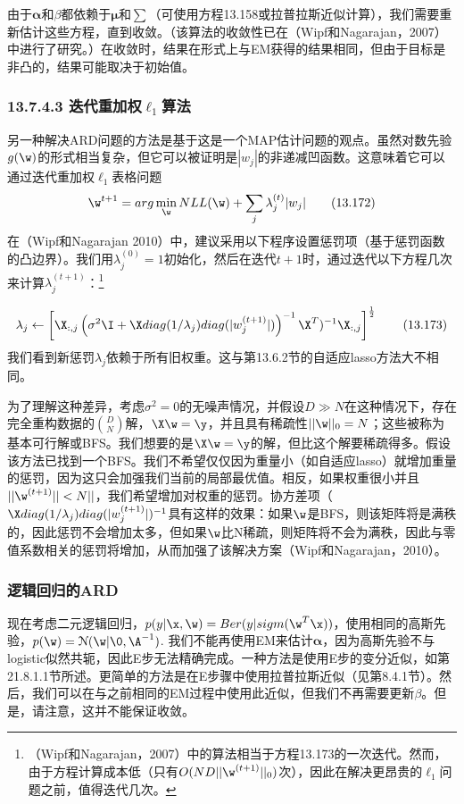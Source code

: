 \documentclass[a4paper]{article}
\begin{document}
由于$\boldsymbol{\alpha}$和$\beta$都依赖于$\boldsymbol{\mu}$和$\boldsymbol{\textstyle\sum}$（可使用方程13.158或拉普拉斯近似计算），我们需要重新估计这些方程，直到收敛。（该算法的收敛性已在（Wipf和Nagarajan，2007）中进行了研究。）在收敛时，结果在形式上与EM获得的结果相同，但由于目标是非凸的，结果可能取决于初始值。

\subsubsection*{13.7.4.3  迭代重加权$\ell_1$算法}
另一种解决ARD问题的方法是基于这是一个MAP估计问题的观点。虽然对数先验$g(\w)$的形式相当复杂，但它可以被证明是$|w_j|$的非递减凹函数。这意味着它可以通过迭代重加权$\ell_1$表格问题
\begin{equation}
	\w^{t+1}=arg \min_\w NLL(\w)+\sum_{j}\lambda_j^{(t)}|w_j|\tag{13.172}
\end{equation}
在（Wipf和Nagarajan 2010）中，建议采用以下程序设置惩罚项（基于惩罚函数的凸边界）。我们用$\lambda_j^{(0)}=1$初始化，然后在迭代$t+1$时，通过迭代以下方程几次来计算$\lambda_j^{(t+1)}$：\footnote{（Wipf和Nagarajan，2007）中的算法相当于方程13.173的一次迭代。然而，由于方程计算成本低（只有$O(ND||\w^{(t+1)}||_0)$次），因此在解决更昂贵的$\ell_1$问题之前，值得迭代几次。}

\begin{equation}
	\lambda_j\gets \left[\X_{:,j}\left(\sigma^2\I+\X diag(1/\lambda_j)diag(|w_j^{(t+1)}|)\right)^{-1}\X^T)^{-1}\X_{:,j}\right]^{\frac{1}{2}}\tag{13.173}
\end{equation}
我们看到新惩罚$\lambda_j$依赖于所有旧权重。这与第13.6.2节的自适应lasso方法大不相同。

为了理解这种差异，考虑$\sigma^2=0$的无噪声情况，并假设$D\gg N$在这种情况下，存在完全重构数据的$\binom{D}{N}$解，$\X \w=\y$，并且具有稀疏性$||\w||_0=N$；这些被称为基本可行解或BFS。我们想要的是$\X\w=\y$的解，但比这个解要稀疏得多。假设该方法已找到一个BFS。我们不希望仅仅因为重量小（如自适应lasso）就增加重量的惩罚，因为这只会加强我们当前的局部最优值。相反，如果权重很小并且$||\w^{(t+1)}||<N||$，我们希望增加对权重的惩罚。协方差项（$\X diag(1/\lambda_j)diag(|w_j^{(t+1)}|)^{-1}$具有这样的效果：如果$\w$是BFS，则该矩阵将是满秩的，因此惩罚不会增加太多，但如果$\w$比N稀疏，则矩阵将不会为满秩，因此与零值系数相关的惩罚将增加，从而加强了该解决方案（Wipf和Nagarajan，2010）。

\subsubsection{逻辑回归的ARD}
现在考虑二元逻辑回归，$p(y|\x,\w)=Ber(y|sigm(\w^T\x))$，使用相同的高斯先验，$p(\w)=\mathcal{N}(\w|\0,\A^{-1})$. 我们不能再使用EM来估计$\boldsymbol{\alpha}$，因为高斯先验不与logistic似然共轭，因此E步无法精确完成。一种方法是使用E步的变分近似，如第21.8.1.1节所述。更简单的方法是在E步骤中使用拉普拉斯近似（见第8.4.1节）。然后，我们可以在与之前相同的EM过程中使用此近似，但我们不再需要更新$\beta$。但是，请注意，这并不能保证收敛。
\end{document}
